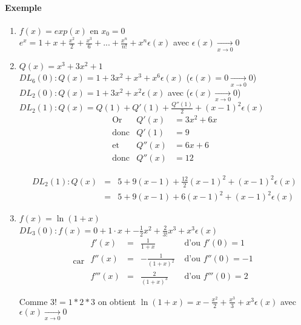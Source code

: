 	\paragraph{Exemple} \begin{enumerate}
		\item$f(x) = exp(x)$ en $x_0=0$ ~\\
				$e^x = 1+x+\frac{x^2}{2} + \frac{x^3}{6} + ... + \frac{x^n}{n!} + x^n \epsilon(x)$ avec $\epsilon (x) \xrightarrow[x \to 0]{} 0$
		\item $Q(x) = x^3 + 3x^2 + 1$ ~\\
			$DL_6(0) : Q(x) = 1+3x^2 + x^3 + x^6 \epsilon(x) $ ($\epsilon (x) = 0 \xrightarrow[x \to 0]{} 0$) ~\\
			$DL_2(0) : Q(x) = 1 +3x^2 + x^2 \epsilon (x)$ avec ($\epsilon (x) \xrightarrow[x \to 0]{} 0$) ~\\
			$DL_2(1) : Q(x) = Q(1) + Q'(1) + \frac{Q''(1)}{2} + (x-1)^2\epsilon (x)$ \[\begin{array}{rcl}
					\text{Or} & Q'(x) &= 3x^2 + 6x \\
					\text{donc} & Q'(1) &= 9 \\
					\text{et} & Q''(x) &= 6x+6 \\
			\text{donc} & Q''(x) &=12 \end{array}\]

					\[ \begin{array}{rcl}
							DL_2(1) : Q(x) &=& 5+9(x-1)+\frac{12}{2}(x-1)^2 + (x-1)^2 \epsilon (x) \\
										   &=& 5 + 9(x-1)+6(x-1)^2 + (x-1)^2 \epsilon (x)
					\end{array}\]

				\item $f(x) = \ln(1+x) $ ~\\
					$DL_3(0) : f(x) = 0 + 1 \cdot x + -\frac{1}{2}x^2 + \frac{2}{3!}x^3 + x^3 \epsilon (x) $ ~\\
					\[\text{car } \begin{array}{rclr}
							f'(x) &=& \frac{1}{1+x} & \text{ d'ou } f'(0) = 1 \\
							f''(x) &=& -\frac{1}{(1+x)^2} & \text{ d'ou } f''(0) = - 1 \\
							f'''(x) &=& \frac{2}{(1+x)^3} & \text{ d'ou } f'''(0) = 2
					\end{array}\]

	Comme $3! = 1 * 2 * 3$ on obtient $\ln (1+x) = x - \frac{x^2}{2} + \frac{x^3}{3} + x^3 \epsilon (x)$ avec $\epsilon(x) \xrightarrow[x \to 0]{} 0$


\end{enumerate}
